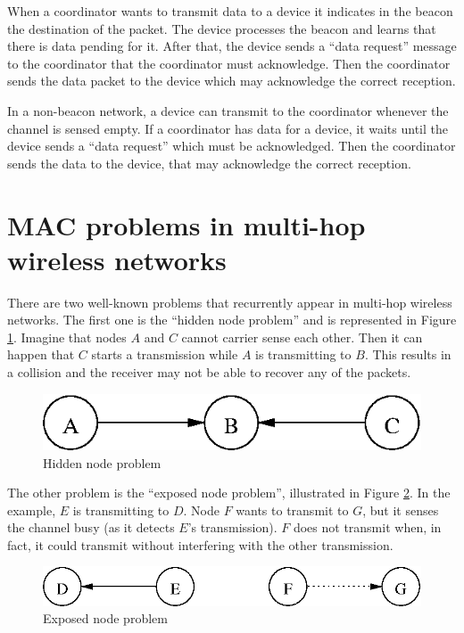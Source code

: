 When a coordinator wants to transmit data to a device it indicates in the beacon the destination of the packet.
The device processes the beacon and learns that there is data pending for it.
After that, the device sends a ``data request'' message to the coordinator that the coordinator must acknowledge.
Then the coordinator sends the data packet to the device which may acknowledge the correct reception.

In a non-beacon network, a device can transmit to the coordinator whenever the channel is sensed empty.
If a coordinator has data for a device, it waits until the device sends a ``data request'' which must be acknowledged.
Then the coordinator sends the data to the device, that may acknowledge the correct reception.

\section{MAC problems in multi-hop wireless networks}

There are two well-known problems that recurrently appear in multi-hop wireless networks.
The first one is the ``hidden node problem'' and is represented in Figure \ref{fig:hidden}.
Imagine that nodes $A$ and $C$ cannot carrier sense each other. 
Then it can happen that $C$ starts a transmission while $A$ is transmitting to $B$.
This results in a collision and the receiver may not be able to recover any of the packets.

\begin{figure}[htbp]
  \centering
  \includegraphics[height=0.1\linewidth]{figures/hidden.eps}
  \caption{Hidden node problem}
  \label{fig:hidden}
\end{figure}

The other problem is the ``exposed node problem'', illustrated in Figure \ref{fig:exposed}.
In the example, $E$ is transmitting to $D$.
Node $F$ wants to transmit to $G$, but it senses the channel busy (as it detects $E$'s transmission).
$F$ does not transmit when, in fact, it could transmit without interfering with the other transmission.
\begin{figure}[htbp]
  \centering
  \includegraphics[height=0.1\linewidth]{figures/exposed.eps}
  \caption{Exposed node problem}
  \label{fig:exposed}
\end{figure}

